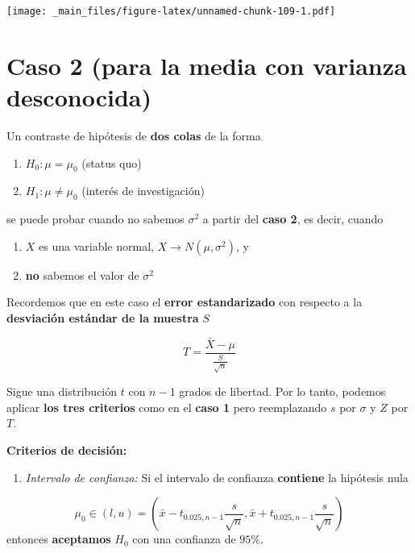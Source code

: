 \documentclass[
]{book}
\providecommand{\tightlist}{%
  \setlength{\itemsep}{0pt}\setlength{\parskip}{0pt}}
\begin{document}
\texttt{[image: \_main\_files/figure-latex/unnamed-chunk-109-1.pdf]}

\hypertarget{caso-2-para-la-media-con-varianza-desconocida}{%
\section{Caso 2 (para la media con varianza desconocida)}\label{caso-2-para-la-media-con-varianza-desconocida}}

Un contraste de hipótesis de \textbf{dos colas} de la forma

\begin{enumerate}
\def\labelenumi{\alph{enumi}.}
\tightlist
\item
  \(H_0:\mu = \mu_0\) (status quo)
\item
  \(H_1:\mu \neq \mu_0\) (interés de investigación)
\end{enumerate}

se puede probar cuando no sabemos \(\sigma^2\) a partir del \textbf{caso 2}, es decir, cuando

\begin{enumerate}
\def\labelenumi{\arabic{enumi}.}
\tightlist
\item
  \(X\) es una variable normal, \(X \rightarrow N(\mu, \sigma^2)\), y
\item
  \textbf{no} sabemos el valor de \(\sigma^2\)
\end{enumerate}

Recordemos que en este caso el \textbf{error estandarizado} con respecto a la \textbf{desviación estándar de la muestra} \(S\)

\[T=\frac{\bar{X}-\mu}{\frac{S}{\sqrt{n}}}\]

Sigue una distribución \(t\) con \(n-1\) grados de libertad. Por lo tanto, podemos aplicar \textbf{los tres criterios} como en el \textbf{caso 1} pero reemplazando \(s\) por \(\sigma\) y \(Z\) por \(T\).

\textbf{Criterios de decisión:}

\begin{enumerate}
\def\labelenumi{\arabic{enumi}.}
\tightlist
\item
  \emph{Intervalo de confianza:} Si el intervalo de confianza \textbf{contiene} la hipótesis nula
\end{enumerate}

\[\mu_0\in (l,u)=(\bar{x}-t_{0.025,n-1} \frac{s}{\sqrt{n}}, \bar{x}+t_{0.025, n-1} \frac{s}{\sqrt{n}})\] entonces \textbf{aceptamos} \(H_0\) con una confianza de \(95\%\).
\end{document}
